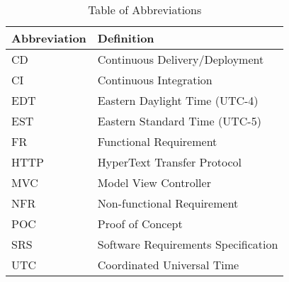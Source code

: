\documentclass[12pt, titlepage]{article}
\begin{document}
\begin{table}[hbp]
    \caption{Table of Abbreviations}
    \label{Table}
    \begin{tabularx}{\textwidth}{p{3cm}X}
        \toprule
        \textbf{Abbreviation} & \textbf{Definition} \\
        \midrule
        CD & Continuous Delivery/Deployment\\
        CI & Continuous Integration\\
        EDT & Eastern Daylight Time (UTC-4)\\
        EST & Eastern Standard Time (UTC-5)\\
        FR & Functional Requirement\\
        HTTP & HyperText Transfer Protocol\\
        MVC & Model View Controller\\
        NFR & Non-functional Requirement\\
        POC & Proof of Concept\\
        SRS & Software Requirements Specification\\
        UTC & Coordinated Universal Time\\
        \bottomrule
    \end{tabularx}
\end{table}
\newpage
\end{document}
